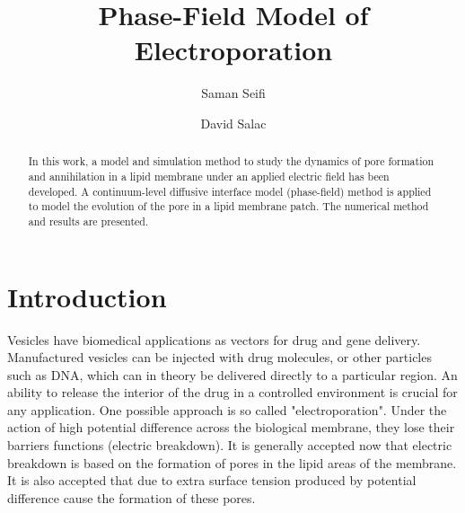 \documentclass[english,12pt]{article}
\begin{document}
\title{Phase-Field Model of Electroporation}

\author{Saman Seifi}
\author{David Salac}

\date{}

\maketitle

\begin{abstract}
In this work, a model and simulation method to study the dynamics of pore formation and annihilation in a lipid membrane under an applied electric field has been developed. A continuum-level diffusive interface model (phase-field) method is applied to model the evolution of the pore in a lipid membrane patch. The numerical method and results are presented.	
\end{abstract}


\section{Introduction}

Vesicles have biomedical applications as vectors for drug and gene delivery. Manufactured vesicles can be injected with drug molecules, or other particles such as DNA, which can in theory be delivered directly to a particular region.
An ability to release the interior of the drug in a controlled environment is crucial for any application. One possible approach is so called "electroporation". Under the action of high potential difference across the biological membrane, they lose their barriers functions (electric breakdown). It is generally accepted now that electric breakdown is based on the formation of pores in the lipid areas of the membrane. It is also accepted that due to extra surface tension produced by potential difference cause the formation of these pores.
 
\end{document}
